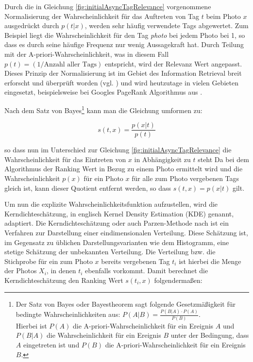 Durch die in Gleichung \ref{fig:initialAsyncTagRelevance} vorgenommene Normalisierung der Wahrscheinlichkeit für das Auftreten von Tag $t$ beim Photo $x$ ausgedrückt durch $p(t \vert x)$, werden sehr häufig verwendete Tags abgewertet. Zum Beispiel liegt die Wahrscheinlichkeit für den Tag \emph{photo} bei jedem Photo bei 1, so dass es durch seine häufige Frequenz nur wenig Aussagekraft hat. Durch Teilung mit der A-priori-Wahrscheinlichkeit, was in diesem Fall $p(t) = (1 / \text{Anzahl aller Tags})$ entspricht, wird der Relevanz Wert angepasst. Dieses Prinzip der Normalisierung ist im Gebiet des Information Retrieval breit erforscht und überprüft worden (vgl. \cite{bingLiu}) und wird heutzutage in vielen Gebieten eingesetzt, beispielsweise bei Googles PageRank Algorithmus aus \cite{googlePageRank}.
 
Nach dem Satz von Bayes\footnote{Der Satz von Bayes oder Bayestheorem sagt folgende Gesetzmäßigkeit für bedingte Wahrscheinlichkeiten aus: $P(A|B) = \frac{P(B \vert A) \cdot P(A)} {P(B)}$.\\ Hierbei ist $P(A)$ die A-priori-Wahrscheinlichkeit für ein Ereignis $A$ und $P(B \vert A)$ die Wahrscheinlichkeit für ein Ereignis $B$ unter der Bedingung, dass $A$ eingetreten ist und $P(B)$ die A-priori-Wahrscheinlichkeit für ein Ereignis $B$. } kann man die Gleichung umformen zu:

\begin{figure}[hptb]
  \begin{equation}
  \label{fig:bayesInitialRelevance}
    s(t, x) = \frac{p(x \vert t)}{ p(t) }
  \end{equation}
\end{figure} 

so dass nun im Unterschied zur Gleichung \ref{fig:initialAsyncTagRelevance} die Wahrscheinlichkeit für das Eintreten von $x$ in Abhängigkeit zu $t$ steht
Da bei dem Algorithmus der Ranking Wert in Bezug zu einem Photo ermittelt wird und die Wahrscheinlichkeit $p(x)$ für ein Photo $x$ für alle zum Photo vergebenen Tags gleich ist, kann dieser Quotient entfernt werden, so dass $s(t,x) = p(x \vert t)$ gilt.

Um nun die explizite Wahrscheinlichkeitsfunktion aufzustellen, wird die Kerndichteschätzung, in englisch Kernel Density Estimation (KDE) genannt, adaptiert. Die Kerndichteschätzung oder auch Parzen-Methode nach \cite{parzen} ist ein Verfahren zur Darstellung einer eindimensionalen Verteilung. Diese Schätzung ist, im Gegensatz zu üblichen Darstellungsvarianten wie dem Histogramm, eine stetige Schätzung der unbekannten Verteilung. Die Verteilung bzw. die Stichprobe für ein zum Photo $x$ bereits vergebenen Tag $t_i$ ist hierbei die Menge der Photos $X_i$, in denen $t_i$ ebenfalls vorkommt. Damit berechnet die Kerndichteschätzung den Ranking Wert $s(t_i, x)$ folgendermaßen:

